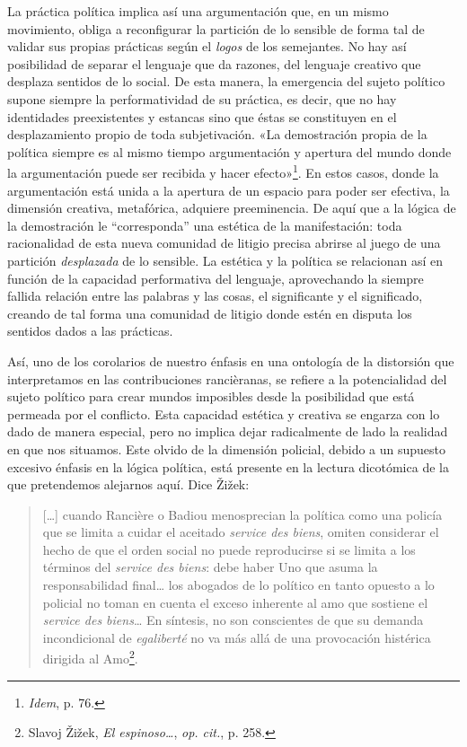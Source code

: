 La práctica política implica así una argumentación que, en un mismo movimiento, obliga a reconfigurar la partición de lo sensible de forma tal de validar sus propias prácticas según el \emph{logos} de los semejantes. No hay así posibilidad de separar el lenguaje que da razones, del lenguaje creativo que desplaza sentidos de lo social. De esta manera, la emergencia del sujeto político supone siempre la performatividad de su práctica, es decir, que no hay identidades preexistentes y estancas sino que éstas se constituyen en el desplazamiento propio de toda subjetivación. «La demostración propia de la política siempre es al mismo tiempo argumentación y apertura del mundo donde la argumentación puede ser recibida y hacer efecto»\footnote{\emph{Idem}, p. 76.}. En estos casos, donde la argumentación está unida a la apertura de un espacio para poder ser efectiva, la dimensión creativa, metafórica, adquiere preeminencia. De aquí que a la lógica de la demostración le ``corresponda'' una estética de la manifestación: toda racionalidad de esta nueva comunidad de litigio precisa abrirse al juego de una partición \emph{desplazada} de lo sensible. La estética y la política se relacionan así en función de la capacidad performativa del lenguaje, aprovechando la siempre fallida relación entre las palabras y las cosas, el significante y el significado, creando de tal forma una comunidad de litigio donde estén en disputa los sentidos dados a las prácticas.

Así, uno de los corolarios de nuestro énfasis en una ontología de la distorsión que interpretamos en las contribuciones rancièranas, se refiere a la potencialidad del sujeto político para crear mundos imposibles desde la posibilidad que está permeada por el conflicto. Esta capacidad estética y creativa se engarza con lo dado de manera especial, pero no implica dejar radicalmente de lado la realidad en que nos situamos. Este olvido de la dimensión policial, debido a un supuesto excesivo énfasis en la lógica política, está presente en la lectura dicotómica de la que pretendemos alejarnos aquí. Dice Žižek:

\begin{quote}
{[}\ldots{]} cuando Rancière o Badiou menosprecian la política como una policía que se limita a cuidar el aceitado \emph{service des biens}, omiten considerar el hecho de que el orden social no puede reproducirse si se limita a los términos del \emph{service des biens}: debe haber Uno que asuma la responsabilidad final\ldots{} los abogados de lo político en tanto opuesto a lo policial no toman en cuenta el exceso inherente al amo que sostiene el \emph{service des biens}\ldots{} En síntesis, no son conscientes de que su demanda incondicional de \emph{egaliberté} no va más allá de una provocación histérica dirigida al Amo\footnote{Slavoj Žižek, \emph{El espinoso\ldots{}}, \emph{op. cit.}, p. 258.}.
\end{quote}

